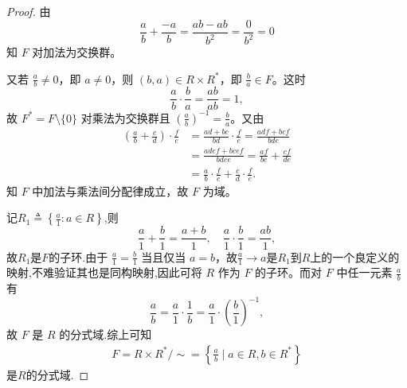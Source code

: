 \documentclass[../../main.tex]{subfiles}%
\begin{document}
\begin{proof}
由
\[
\frac{a}{b} + \frac{-a}{b} = \frac{ab - ab}{b^2} = \frac{0}{b^2} = 0
\]
知 \( F \) 对加法为交换群。

又若 \( \frac{a}{b} \neq 0 \)，即 \( a \neq 0 \)，则 \( (b, a) \in R \times R^* \)，即 \( \frac{b}{a} \in F \)。这时
\[
\frac{a}{b} \cdot \frac{b}{a} = \frac{ab}{ab} = 1,
\]
故 \( F^* = F \setminus \{0\} \) 对乘法为交换群且 \( \left( \frac{a}{b} \right)^{-1} = \frac{b}{a} \)。又由
\begin{align*}
\left( \frac{a}{b} + \frac{c}{d} \right) \cdot \frac{f}{e} &= \frac{ad + bc}{bd} \cdot \frac{f}{e} = \frac{adf + bcf}{bde} \\
&= \frac{adef + bcef}{bdee} = \frac{af}{be} + \frac{cf}{de} \\
&= \frac{a}{b} \cdot \frac{f}{e} + \frac{c}{d} \cdot \frac{f}{e}.
\end{align*}
知 \( F \) 中加法与乘法间分配律成立，故 \( F \) 为域。

记$R_1 \triangleq \left\{ \frac{a}{1}:a\in R \right\} $,则
\[
\frac{a}{1} + \frac{b}{1} = \frac{a + b}{1}, \quad \frac{a}{1} \cdot \frac{b}{1} = \frac{ab}{1},
\]
故$R_1$是$F$的子环.由于 \( \frac{a}{1} = \frac{b}{1} \) 当且仅当 \( a = b \)，故$\frac{a}{1}\to a$是$R_1$到$R$上的一个良定义的映射,不难验证其也是同构映射,因此可将 \( R \) 作为 \( F \) 的子环。而对 \( F \) 中任一元素 \( \frac{a}{b} \) 有
\[
\frac{a}{b} = \frac{a}{1} \cdot \frac{1}{b} = \frac{a}{1} \cdot \left( \frac{b}{1} \right)^{-1},
\]
故 \( F \) 是 \( R \) 的分式域.综上可知
\begin{align*}
F=R\times R^*/\sim =\left\{ \frac{a}{b}\mid a\in R,b\in R^* \right\} 
\end{align*}
是$R$的分式域.
\end{proof}
\end{document}
